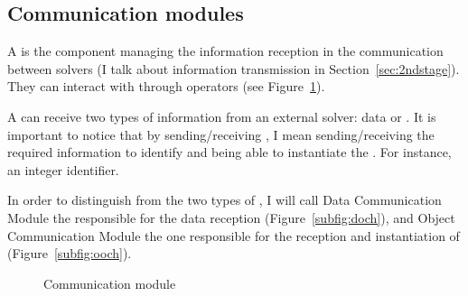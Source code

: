 \subsection{Communication modules}


A \opch{} is the component managing the information reception in the communication between solvers (I talk about information transmission in Section~\ref{sec:2ndstage}). They can interact with \oms{} through operators (see Figure~\ref{fig:och}).

A \opch{} can receive two types of information from an external solver: data or \oms{}. It is important to notice that by sending/receiving \oms, I mean sending/receiving the required information to identify and being able to instantiate the \om. For instance, an integer identifier.

In order to distinguish from the two types of \opchs, I will call Data Communication Module the \opch{} responsible for the data reception (Figure~\ref{subfig:doch}), and Object Communication Module the one responsible for the reception and instantiation of \oms{} (Figure~\ref{subfig:ooch}).


%

\begin{figure}
	\centering
	\hspace{0.05\textwidth}%
	\caption[]{Communication module}
	\label{fig:och}
\end{figure}

